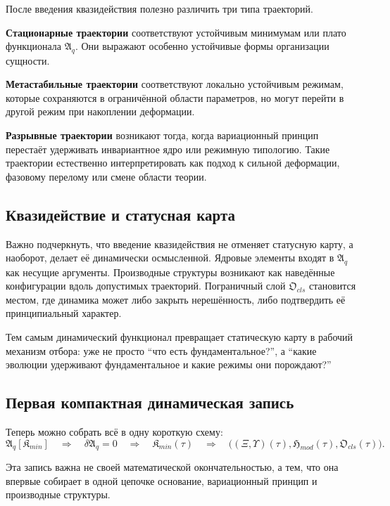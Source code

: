 \documentclass[12pt,a4paper]{article}
\begin{document}
После введения квазидействия полезно различить три типа траекторий.

\textbf{Стационарные траектории} соответствуют устойчивым минимумам или плато функционала \(\mathfrak{A}_{q}\). Они выражают особенно устойчивые формы организации сущности.

\textbf{Метастабильные траектории} соответствуют локально устойчивым режимам, которые сохраняются в ограничённой области параметров, но могут перейти в другой режим при накоплении деформации.

\textbf{Разрывные траектории} возникают тогда, когда вариационный принцип перестаёт удерживать инвариантное ядро или режимную типологию. Такие траектории естественно интерпретировать как подход к сильной деформации, фазовому перелому или смене области теории.

\subsection{Квазидействие и статусная карта}

Важно подчеркнуть, что введение квазидействия не отменяет статусную карту, а наоборот, делает её динамически осмысленной. Ядровые элементы входят в \(\mathfrak{A}_{q}\) как несущие аргументы. Производные структуры возникают как наведённые конфигурации вдоль допустимых траекторий. Пограничный слой \(\mathfrak{O}_{cls}\) становится местом, где динамика может либо закрыть нерешённость, либо подтвердить её принципиальный характер.

Тем самым динамический функционал превращает статическую карту в рабочий механизм отбора: уже не просто ``что есть фундаментальное?'', а ``какие эволюции удерживают фундаментальное и какие режимы они порождают?''

\subsection{Первая компактная динамическая запись}

Теперь можно собрать всё в одну короткую схему:
\begin{equation}
\mathfrak{A}_{q}[\mathfrak{K}_{min}] 
\quad \Longrightarrow \quad
\delta \mathfrak{A}_{q}=0
\quad \Longrightarrow \quad
\mathfrak{K}_{min}(\tau)
\quad \Longrightarrow \quad
\bigl((\Xi,\Upsilon)(\tau),\mathfrak{H}_{mod}(\tau),\mathfrak{O}_{cls}(\tau)\bigr).
\end{equation}

Эта запись важна не своей математической окончательностью, а тем, что она впервые собирает в одной цепочке основание, вариационный принцип и производные структуры.
\end{document}
